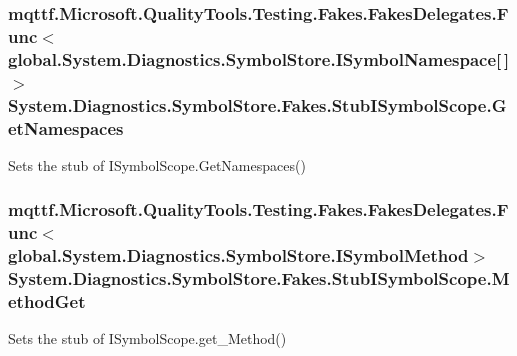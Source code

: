 \hypertarget{class_system_1_1_diagnostics_1_1_symbol_store_1_1_fakes_1_1_stub_i_symbol_scope_a2a34d6471c1281e9d19acdce8ce3baf7}{
\subsubsection[{Get\-Namespaces}]{\setlength{\rightskip}{0pt plus 5cm}mqttf.\-Microsoft.\-Quality\-Tools.\-Testing.\-Fakes.\-Fakes\-Delegates.\-Func$<$global.\-System.\-Diagnostics.\-Symbol\-Store.\-I\-Symbol\-Namespace\mbox{[}$\,$\mbox{]}$>$ System.\-Diagnostics.\-Symbol\-Store.\-Fakes.\-Stub\-I\-Symbol\-Scope.\-Get\-Namespaces}}\label{class_system_1_1_diagnostics_1_1_symbol_store_1_1_fakes_1_1_stub_i_symbol_scope_a2a34d6471c1281e9d19acdce8ce3baf7}


Sets the stub of I\-Symbol\-Scope.\-Get\-Namespaces()

\hypertarget{class_system_1_1_diagnostics_1_1_symbol_store_1_1_fakes_1_1_stub_i_symbol_scope_a5de1d68c808390bf58f21ef6b7178a43}{
\subsubsection[{Method\-Get}]{\setlength{\rightskip}{0pt plus 5cm}mqttf.\-Microsoft.\-Quality\-Tools.\-Testing.\-Fakes.\-Fakes\-Delegates.\-Func$<$global.\-System.\-Diagnostics.\-Symbol\-Store.\-I\-Symbol\-Method$>$ System.\-Diagnostics.\-Symbol\-Store.\-Fakes.\-Stub\-I\-Symbol\-Scope.\-Method\-Get}}\label{class_system_1_1_diagnostics_1_1_symbol_store_1_1_fakes_1_1_stub_i_symbol_scope_a5de1d68c808390bf58f21ef6b7178a43}


Sets the stub of I\-Symbol\-Scope.\-get\-\_\-\-Method()

